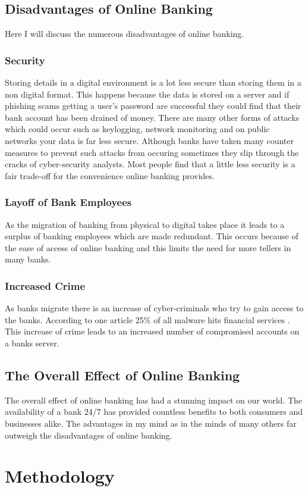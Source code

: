 \section{Disadvantages of Online Banking}
Here I will discuss the numerous disadvantages of online banking.
\subsection{Security}
Storing details in a digital environment is a lot less secure than storing them
in a non digital format.  This happens because the data is stored on a server
and if phishing scams getting a user's password are successful they could find that
their bank account has been drained of money.  There are many other forms of attacks
which could occur such as keylogging, network monitoring and on public networks
your data is far less secure.  Although banks have taken many counter measures
to prevent such attacks from occuring sometimes they slip through the cracks of
cyber-security analysts\cite{BankHacks}.  Most people find that a little less security is a fair
trade-off for the convenience online banking provides.
\subsection{Layoff of Bank Employees}
As the migration of banking from physical to digital takes place it leads to
a surplus of banking employees which are made redundant.  This occurs because
of the ease of access of online banking and this limits the need for more
tellers in many banks.
\subsection{Increased Crime}
As banks migrate there is an increase of cyber-criminals who try to gain access
to the banks.  According to one article 25\% of all malware hits financial services
\cite{ForbesBankHack}.  This increase of crime leads to an increased number of compromised
accounts on a banks server.
\section{The Overall Effect of Online Banking}
The overall effect of online banking has had a stunning impact on our world.
The availability of a bank 24/7 has provided countless benefits to both consumers
and businesses alike.  The advantages in my mind as in the minds of many others
far outweigh the disadvantages of online banking.
\chapter{Methodology}
